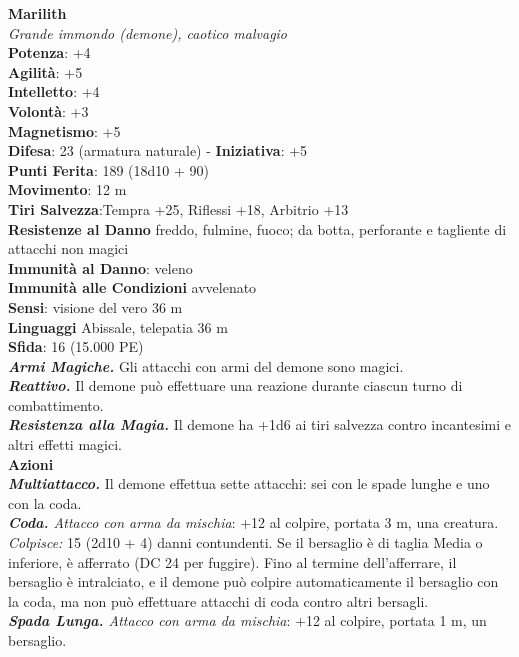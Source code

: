 \begin{multicols}{2}
\medskip\textbf{Marilith}\\
\emph{Grande immondo (demone), caotico malvagio}\\
\textbf{Potenza}: +4\\
\textbf{Agilità}: +5\\
\textbf{Intelletto}: +4\\
\textbf{Volontà}: +3\\
\textbf{Magnetismo}: +5\\
\textbf{Difesa}: 23 (armatura naturale) - \textbf{Iniziativa}: +5\\
\textbf{Punti Ferita}: 189 (18d10 + 90)\\
\textbf{Movimento}: 12 m\\
\textbf{Tiri Salvezza}:Tempra +25, Riflessi +18, Arbitrio +13\\
\textbf{Resistenze al Danno} freddo, fulmine, fuoco; da botta, perforante e tagliente di attacchi non magici\\
\textbf{Immunità al Danno}: veleno\\
\textbf{Immunità alle Condizioni} avvelenato\\
\textbf{Sensi}: visione del vero 36 m\\
\textbf{Linguaggi} Abissale, telepatia 36 m\\
\textbf{Sfida}: 16 (15.000 PE)\smallskip\\
\emph{\textbf{Armi Magiche.}} Gli attacchi con armi del demone sono magici.\\
\emph{\textbf{Reattivo.}} Il demone può effettuare una reazione durante ciascun turno di combattimento.\\
\emph{\textbf{Resistenza alla Magia.}} Il demone ha +1d6 ai tiri salvezza contro incantesimi e altri effetti magici.\\
\smallskip\textbf{Azioni}\\
\emph{\textbf{Multiattacco.}} Il demone effettua sette attacchi: sei con le spade lunghe e uno con la coda.\\
\emph{\textbf{Coda.} Attacco con arma da mischia}: +12 al colpire, portata 3 m, una creatura.\\
\emph{Colpisce:} 15 (2d10 + 4) danni contundenti. Se il bersaglio è di taglia Media o inferiore, è afferrato (DC  24 per fuggire). Fino al termine dell'afferrare, il bersaglio è intralciato, e il demone può colpire automaticamente il bersaglio con la coda, ma non può effettuare attacchi di coda contro altri bersagli.\\
\emph{\textbf{Spada Lunga.} Attacco con arma da mischia}: +12 al colpire, portata 1 m, un bersaglio.\\

\end{multicols}
